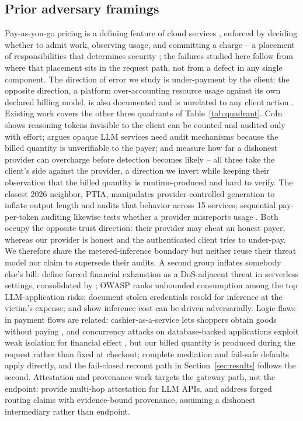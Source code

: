 \documentclass[manuscript,review,anonymous]{acmart}
\begin{document}
\subsection{Prior adversary framings}
Pay-as-you-go pricing is a defining feature of cloud services \citep{armbrust}, enforced
by deciding whether to admit work, observing usage, and committing a charge -- a
placement of responsibilities that determines security \citep{bass}; the failures studied
here follow from where that placement sits in the request path, not from a defect in any
single component. The direction of error we study is under-payment by the client; the
opposite direction, a platform over-accounting resource usage against its own declared
billing model, is also documented and is unrelated to any client action
\citep{serverlesscosts}. Existing work covers the other three quadrants of
Table~\ref{tab:quadrant}. CoIn \citep{coin} shows reasoning tokens invisible to the client
can be counted and audited only with effort; \citet{invisible} argues opaque LLM services
need audit mechanisms because the billed quantity is unverifiable to the payer; and
\citet{tokeninflation} measure how far a dishonest provider can overcharge before
detection becomes likely -- all three take the client's side against the provider, a
direction we invert while keeping their observation that the billed quantity is
runtime-produced and hard to verify. The closest 2026 neighbor, PTIA, manipulates
provider-controlled generation to inflate output length and audits that behavior across
15 services; sequential pay-per-token auditing likewise tests whether a provider
misreports usage \citep{ptia,auditingpaypertoken}. Both occupy the opposite trust
direction: their provider may cheat an honest payer, whereas our provider is honest and
the authenticated client tries to under-pay. We therefore share the metered-inference
boundary but neither reuse their threat model nor claim to supersede their audits. A
second group inflates somebody else's bill: \citet{dow} define forced financial
exhaustion as a DoS-adjacent threat in serverless settings, consolidated by
\citet{dowreview}; OWASP \citep{owasp} ranks unbounded consumption among the top
LLM-application risks; \citet{llmjacking} document stolen credentials resold for
inference at the victim's expense; and \citet{sponge} show inference cost can be driven
adversarially. Logic flaws in payment flows are related: cashier-as-a-service lets
shoppers obtain goods without paying \citep{cashier}, and concurrency attacks on
database-backed applications exploit weak isolation for financial effect
\citep{acidrain}, but our billed quantity is produced during the request rather than
fixed at checkout; complete mediation and fail-safe defaults \citep{saltzer} apply
directly, and the fail-closed recount path in Section~\ref{sec:results} follows the
second. Attestation and provenance work targets the gateway path, not the endpoint: \citet{aex}
provide multi-hop attestation for LLM APIs, and \citet{gwprov} address forged routing
claims with evidence-bound provenance, assuming a dishonest intermediary rather than
endpoint.
\end{document}
